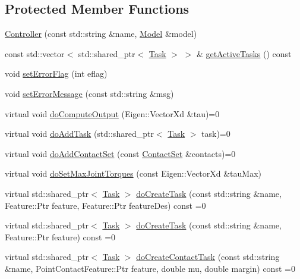 \subsection*{Protected Member Functions}
\begin{DoxyCompactItemize}
\item 
\hyperlink{classocra_1_1Controller_a9f72394baa089119cf0b60e3c7160283}{Controller} (const std\+::string \&name, \hyperlink{classocra_1_1Model}{Model} \&model)
\item 
const std\+::vector$<$ std\+::shared\+\_\+ptr$<$ \hyperlink{classocra_1_1Task}{Task} $>$ $>$ \& \hyperlink{classocra_1_1Controller_a47992af5b31c540f8bd7a828eb768276}{get\+Active\+Tasks} () const
\item 
void \hyperlink{classocra_1_1Controller_a36df4135749c17f6d4425fabed37d022}{set\+Error\+Flag} (int eflag)
\item 
void \hyperlink{classocra_1_1Controller_a3e8c327d25152d457172a65d826c84b4}{set\+Error\+Message} (const std\+::string \&msg)
\item 
virtual void \hyperlink{classocra_1_1Controller_a8ca85413067d948459afa5981b3dda32}{do\+Compute\+Output} (Eigen\+::\+Vector\+Xd \&tau)=0
\item 
virtual void \hyperlink{classocra_1_1Controller_ab3477822a9363553c99eefa58ff803eb}{do\+Add\+Task} (std\+::shared\+\_\+ptr$<$ \hyperlink{classocra_1_1Task}{Task} $>$ task)=0
\item 
virtual void \hyperlink{classocra_1_1Controller_acb11edc1ceaa89423c1e58f9cb38a9f7}{do\+Add\+Contact\+Set} (const \hyperlink{classocra_1_1ContactSet}{Contact\+Set} \&contacts)=0
\item 
virtual void \hyperlink{classocra_1_1Controller_a75d6419229980f6088a689fcafc1d224}{do\+Set\+Max\+Joint\+Torques} (const Eigen\+::\+Vector\+Xd \&tau\+Max)
\item 
virtual std\+::shared\+\_\+ptr$<$ \hyperlink{classocra_1_1Task}{Task} $>$ \hyperlink{classocra_1_1Controller_a05f6d757e4125a71bf766df7f069ac43}{do\+Create\+Task} (const std\+::string \&name, Feature\+::\+Ptr feature, Feature\+::\+Ptr feature\+Des) const =0
\item 
virtual std\+::shared\+\_\+ptr$<$ \hyperlink{classocra_1_1Task}{Task} $>$ \hyperlink{classocra_1_1Controller_a358a31c0b6b6bdcc0e6da5c49eb9fde5}{do\+Create\+Task} (const std\+::string \&name, Feature\+::\+Ptr feature) const =0
\item 
virtual std\+::shared\+\_\+ptr$<$ \hyperlink{classocra_1_1Task}{Task} $>$ \hyperlink{classocra_1_1Controller_a823933d261a12aac49f8a0ef56823ea4}{do\+Create\+Contact\+Task} (const std\+::string \&name, Point\+Contact\+Feature\+::\+Ptr feature, double mu, double margin) const =0
\end{DoxyCompactItemize}
